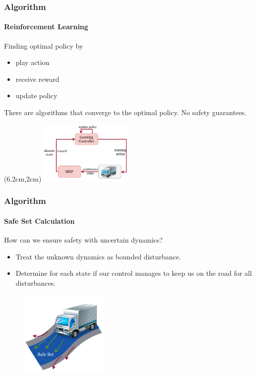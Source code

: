 \documentclass[t]{beamer}
\begin{document}
\begin{frame}
\frametitle{Algorithm}
\framesubtitle{Reinforcement Learning}
Finding optimal policy by 
\begin{itemize}
\item play action
\item receive reward
\item update policy
\end{itemize} 
\vspace{2cm}
 There are algorithms that converge to the optimal policy.
 No safety guarantees.
\begin{textblock*}{18cm}(6.2cm,2cm) %
\includegraphics[trim=0mm 0mm 0mm 0mm, width=0.34\textwidth]{flow_learn_final.png}
\end{textblock*}
\end{frame}

\begin{frame}
\frametitle{Algorithm}
\framesubtitle{Safe Set Calculation}
How can we ensure safety with uncertain dynamics?
\begin{itemize}
\item Treat the unknown dynamics as bounded disturbance.
\item Determine for each state if our control manages to keep us on the road for all disturbances.
\end{itemize}

\begin{figure}
\vspace{-0.1cm}
\includegraphics[clip, trim=3mm 3mm 4mm 10mm, width=0.38\textwidth]{SafeStreet}
\end{figure}

\end{frame}
\end{document}
